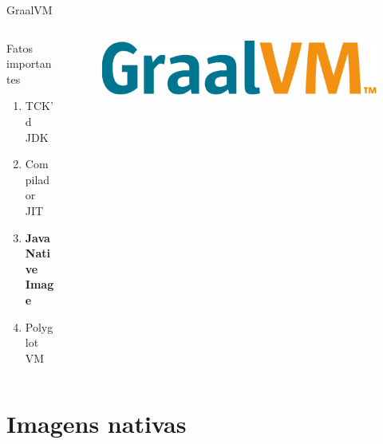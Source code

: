 \documentclass[aspectratio=169]{beamer}
\begin{document}
\begin{frame}{GraalVM}

	\begin{columns}[T] %

		\begin{column}[T]{4cm} %
			Fatos importantes
		\begin{enumerate}
			\item TCK'd JDK
			\item Compilador JIT
			\item \textbf{Java Native Image}
			\item Polyglot VM
		\end{enumerate}
		\end{column}
		\begin{column}[T]{6cm} %
			\begin{figure}
				\centering
				\includegraphics[width=\linewidth]{Images/graalvmlogo}

			\end{figure}

		\end{column}
	\end{columns}


\end{frame}

{
	\section{Imagens nativas}
}
\end{document}
